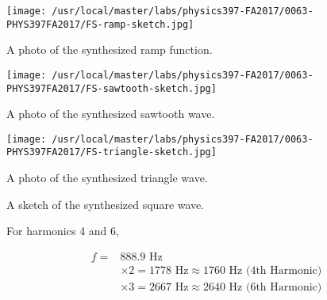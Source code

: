 \begin{enumerate}[resume]
\begin{enumerate}[label=(\Alph*)]
\begin{marginfigure}
\texttt{[image: /usr/local/master/labs/physics397-FA2017/0063-PHYS397FA2017/FS-ramp-sketch.jpg]}
\caption{A photo of the synthesized ramp function.}
\label{fig:fscg10}
\end{marginfigure}



\begin{marginfigure}
\texttt{[image: /usr/local/master/labs/physics397-FA2017/0063-PHYS397FA2017/FS-sawtooth-sketch.jpg]}
\caption{A photo of the synthesized sawtooth wave.}
\label{fig:fscg11}
\end{marginfigure}


\begin{marginfigure}
\texttt{[image: /usr/local/master/labs/physics397-FA2017/0063-PHYS397FA2017/FS-triangle-sketch.jpg]}
\caption{A photo of the synthesized triangle wave.}
\label{fig:fscg12}
\end{marginfigure}


\begin{marginfigure}
\caption{A sketch of the synthesized square wave.}
\label{fig:fscg4}
\end{marginfigure}


For harmonics 4 and 6, 

\begin{align}
f=&888.9\text{ Hz}\\
&\times2=1778\text{ Hz}\approx 1760\text{ Hz (4th Harmonic)}\\
&\times3=2667\text{ Hz}\approx 2640\text{ Hz (6th Harmonic)}
\label{equ:fscg12}
\end{align}\newline


\end{enumerate}
\end{enumerate}
